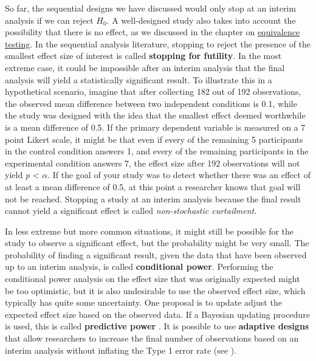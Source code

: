 \documentclass[
  oneside]{book}
\begin{document}
So far, the sequential designs we have discussed would only stop at an interim analysis if we can reject \(H_0\). A well-designed study also takes into account the possibility that there is no effect, as we discussed in the chapter on \protect\hyperlink{equivalencetest}{equivalence testing}. In the sequential analysis literature, stopping to reject the presence of the smallest effect size of interest is called \textbf{stopping for futility}. In the most extreme case, it could be impossible after an interim analysis that the final analysis will yield a statistically significant result. To illustrate this in a hypothetical scenario, imagine that after collecting 182 out of 192 observations, the observed mean difference between two independent conditions is 0.1, while the study was designed with the idea that the smallest effect deemed worthwhile is a mean difference of 0.5. If the primary dependent variable is measured on a 7 point Likert scale, it might be that even if every of the remaining 5 participants in the control condition answers 1, and every of the remaining participants in the experimental condition answers 7, the effect size after 192 observations will not yield \emph{p} \textless{} \(\alpha\). If the goal of your study was to detect whether there was an effect of at least a mean difference of 0.5, at this point a researcher knows that goal will not be reached. Stopping a study at an interim analysis because the final result cannot yield a significant effect is called \emph{non-stochastic curtailment}.

In less extreme but more common situations, it might still be possible for the study to observe a significant effect, but the probability might be very small. The probability of finding a significant result, given the data that have been observed up to an interim analysis, is called \textbf{conditional power}. Performing the conditional power analysis on the effect size that was originally expected might be too optimistic, but it is also undesirable to use the observed effect size, which typically has quite some uncertainty. One proposal is to update adjust the expected effect size based on the observed data. If a Bayesian updating procedure is used, this is called \textbf{predictive power} \citep{spiegelhalter_monitoring_1986}. It is possible to use \textbf{adaptive designs} that allow researchers to increase the final number of observations based on an interim analysis without inflating the Type 1 error rate (see \citet{wassmer_group_2016}).
\end{document}
